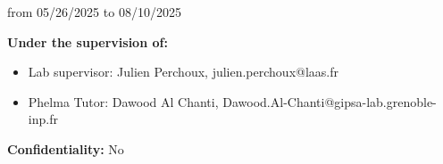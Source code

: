 \begin{titlepage}
    \vspace{0.5cm} %

    \begin{center}
        from  {05/26/2025} to  {08/10/2025} \\
    \end{center}

    \vspace{1cm} %


    \vfill %

    \noindent \textbf{Under the supervision of:} 
    \begin{itemize}
        \item Lab supervisor: Julien Perchoux,  {julien.perchoux@laas.fr}
    \item Phelma Tutor:  {Dawood Al Chanti},  {Dawood.Al-Chanti@gipsa-lab.grenoble-inp.fr}

    \end{itemize}
    \vspace{1.5cm} %

\raggedleft
 \textbf{Confidentiality:}  {No} 
     
\raggedright
    \vspace{1cm} %

    \par %
    \begin{minipage}[b]{0.5\textwidth} %
        \flushleft %
        \small %


\end{minipage}
\end{titlepage}
